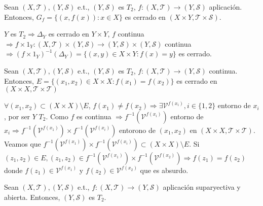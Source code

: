 \begin{cor}
  Sean $( X, \mathcal{T} ), ( Y, \mathcal{S} )$ e.t., $( Y, \mathcal{S} )$ es $T_{2}$, $f: ( X, \mathcal{T} ) \to ( Y, \mathcal{S} )$ aplicación. Entonces, $G_{f} = \{  (x, f(x)) : x \in X \}$ es cerrado en $(X \times Y, \mathcal{T} \times \mathcal{S})$.
\end{cor}

\begin{dem}
  $Y$ es $T_{2} \Rightarrow \Delta_{Y}$ es cerrado en $Y \times Y$, $f$ continua $\Rightarrow f \times 1_{Y}: ( X, \mathcal{T} ) \times ( Y, \mathcal{S} ) \to ( Y, \mathcal{S} ) \times ( Y, \mathcal{S} )$ continua $\Rightarrow (f \times 1_{Y})^{-1}(\Delta_{Y}) = \{ (x, y) \in X \times Y : f(x) = y \}$ es cerrado. 
\end{dem}

\begin{prop}
  Sean $( X, \mathcal{T} ), ( Y, \mathcal{S} )$ e.t., $( Y, \mathcal{S} )$ es $T_{2}$, $f: ( X, \mathcal{T} ) \to ( Y, \mathcal{S} )$ continua. Entonces, $ E =\{ (x_{1}, x_{2}) \in X \times X : f(x_{1}) = f(x_{2})\}$ es cerrado en $ ( X \times X, \mathcal{T} \times \mathcal{T})$
\end{prop}

\begin{dem}
  $\forall (x_{1}, x_{2}) \subset (X \times X) \setminus E$, $f(x_{1}) \neq f(x_{2}) \Rightarrow \exists \mathcal{V}^{f(x_{i})}, i \in \{ 1,2 \}$ entorno de $x_{i}$, por ser $Y$ $T_{2}$. Como $f$ es continua $\Rightarrow f^{-1}(\mathcal{V}^{f(x_{i})})$ entorno de $x_{i} \Rightarrow f^{-1}(\mathcal{V}^{f(x_{1})}) \times f^{-1}(\mathcal{V}^{f(x_{i})})$ entorono de $(x_{1}, x_{2})$ en $( X \times X, \mathcal{T} \times \mathcal{T})$. Veamos que $f^{-1}(\mathcal{V}^{f(x_{1})}) \times f^{-1}(\mathcal{V}^{f(x_{i})}) \subset (X \times X) \setminus E$. Si $(z_{1}, z_{2}) \in E, (z_{1}, z_{2}) \in f^{-1}(\mathcal{V}^{f(x_{1})}) \times f^{-1}(\mathcal{V}^{f(x_{2})}) \Rightarrow f(z_{1})= f(z_{2})$ donde $f(z_{1}) \in \mathcal{V}^{f(x_{1})}$ y $ f(z_{2}) \in \mathcal{V}^{f(x_{2})}$ que es absurdo.
\end{dem}

\begin{prop}
  Sean $ ( X, \mathcal{T} ), ( Y, \mathcal{S} )$ e.t., $f: ( X, \mathcal{T} ) \to ( Y, \mathcal{S} )$ aplicación suparyectiva y abierta. Entonces, $( Y, \mathcal{S} )$ es $ T_{2}$.
\end{prop}

